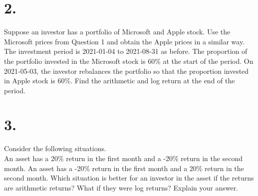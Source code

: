 \documentclass{article}
\begin{document}
\section*{2.}
{\Large

Suppose an investor has a portfolio of Microsoft and Apple stock. Use the Microsoft prices from Question 1 and obtain the Apple prices in a similar way. The investment period is 2021-01-04 to 2021-08-31 as before. The proportion of the portfolio invested in the Microsoft stock is 60\% at the start of the period. On 2021-05-03, the investor rebalances the portfolio so that the proportion invested in Apple stock is 60\%. Find the arithmetic and log return at the end of the period.

}

\section*{3.}
{\Large 

Consider the following situations. \\
An asset has a 20\% return in the first month and a -20\% return in the second month.
An asset has a -20\% return in the first month and a 20\% return in the second month.
Which situation is better for an investor in the asset if the returns are arithmetic returns? What if they were log returns? Explain your answer.

}
\end{document}
